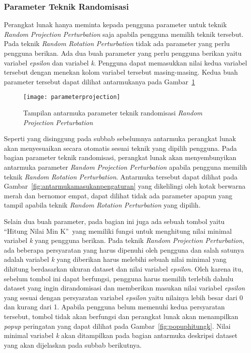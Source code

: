 \subsubsection{Parameter Teknik Randomisasi}
\label{subsubsec:parameterteknik}

Perangkat lunak hanya meminta kepada pengguna parameter untuk teknik \textit{Random Projection Perturbation} saja apabila pengguna memilih teknik tersebut. Pada teknik \textit{Random Rotation Perturbation} tidak ada parameter yang perlu pengguna berikan. Ada dua buah parameter yang perlu pengguna berikan yaitu variabel \textit{epsilon} dan variabel \textit{k}. Pengguna dapat memasukkan nilai kedua variabel tersebut dengan menekan kolom variabel tersebut masing-masing. Kedua buah parameter tersebut dapat dilihat antarmukanya pada Gambar~\ref{fig:parameterprojection}

\begin{figure}
	\centering
	\texttt{[image: parameterprojection]}
	\caption{Tampilan antarmuka parameter teknik randomisasi \textit{Random Projection Perturbation}}
	\label{fig:parameterprojection}
\end{figure}

Seperti yang disinggung pada subbab sebelumnya antarmuka perangkat lunak akan menyesuaikan secara otomatis sesuai teknik yang dipilih pengguna. Pada bagian parameter teknik randomisasi, perangkat lunak akan menyembunyikan antarmuka parameter \textit{Random Projection Perturbation} apabila pengguna memilih teknik \textit{Random Rotation Perturbation}. Antarmuka tersebut dapat dilihat pada Gambar~\ref{fig:antarmukamasukanpengaturan} yang dikelilingi oleh kotak berwarna merah dan bernomor empat, dapat dilihat tidak ada parameter apapun yang tampil apabila teknik \textit{Random Rotation Perturbation} yang dipilih.

Selain dua buah parameter, pada bagian ini juga ada sebuah tombol yaitu \textquotedblleft Hitung Nilai Min K\textquotedblright~yang memiliki fungsi untuk menghitung nilai minimal variabel \textit{k} yang pengguna berikan. Pada teknik \textit{Random Projection Perturbation}, ada beberapa persyaratan yang harus dipenuhi oleh pengguna dan salah satunya adalah variabel \textit{k} yang diberikan harus melebihi sebuah nilai minimal yang dihitung berdasarkan ukuran dataset dan nilai variabel \textit{epsilon}. Oleh karena itu, sebelum tombol ini dapat berfungsi, pengguna harus memilih terlebih dahulu dataset yang ingin dirandomisasi dan memberikan masukan nilai variabel \textit{epsilon} yang sesuai dengan persyaratan variabel \textit{epsilon} yaitu nilainya lebih besar dari 0 dan kurang dari 1. Apabila pengguna belum memenuhi kedua persyaratan tersebut, tombol tidak akan berfungsi dan perangkat lunak akan menampilkan \textit{popup} peringatan yang dapat dilihat pada Gambar~\ref{fig:popuphitungk}. Nilai minimal variabel \textit{k} akan ditampilkan pada bagian antarmuka deskripsi dataset yang akan dijelaskan pada subbab berikutnya.

